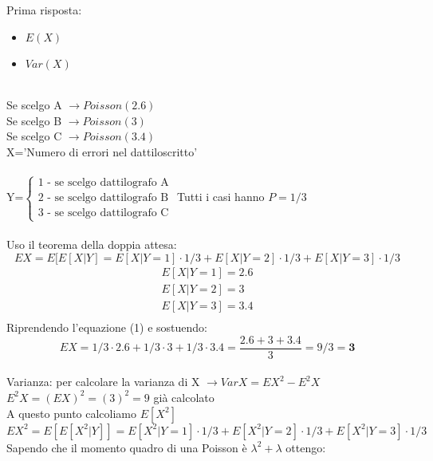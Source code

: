 \documentclass{oxmathproblems}
\begin{document}
\begin{questions}

\miquestion
Prima risposta:
\begin{itemize}
    \item $E(X)$
    \item $Var(X)$
\end{itemize}

\begin{solution}
    \\
    Se scelgo A $\longrightarrow Poisson(2.6)$\\
    Se scelgo B $\longrightarrow Poisson(3)$\\
    Se scelgo C $\longrightarrow Poisson(3.4)$\\
    X='Numero di errori nel dattiloscritto'\\\\
    Y=$\begin{cases}
        1\text{ - se scelgo dattilografo A}\\
        2\text{ - se scelgo dattilografo B}\\
        3\text{ - se scelgo dattilografo C}
    \end{cases}$
    Tutti i casi hanno $P=1/3$\\\\
    Uso il teorema della doppia attesa:\\
    \begin{equation}
        EX=E[E[X|Y]=E[X|Y=1]\cdot1/3+E[X|Y=2]\cdot1/3+E[X|Y=3]\cdot1/3
    \end{equation}
    \[
       \begin{array}{l}
            E[X|Y=1]=2.6\\
            E[X|Y=2]=3\\
            E[X|Y=3]=3.4\\
        \end{array}
    \]
    Riprendendo l'equazione (1) e sostuendo:\\
    \[
    EX=1/3\cdot2.6+1/3\cdot3+1/3\cdot3.4=\frac{2.6+3+3.4}{3}=9/3=\textbf{3}
    \]\\
    Varianza: per calcolare la varianza di X $\longrightarrow VarX=EX^2-E^2X$\\
    $E^2X=(EX)^2=(3)^2=9$ già calcolato\\
    A questo punto calcoliamo $E[X^2]$\\
    $EX^2=E[E[X^2|Y]]=E[X^2|Y=1]\cdot1/3+E[X^2|Y=2]\cdot1/3+E[X^2|Y=3]\cdot1/3$\\
    Sapendo che il momento quadro di una Poisson è $\lambda^2+\lambda$ ottengo:\\

\end{solution}
\end{questions}
\end{document}
